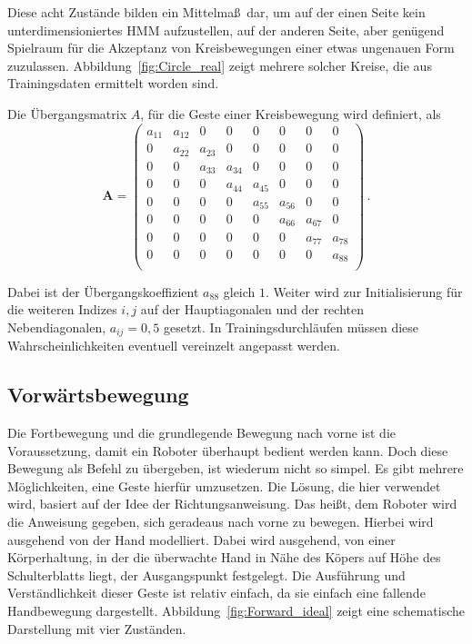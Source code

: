 Diese acht Zust\"ande bilden ein Mittelma\ss~dar, um auf der einen Seite kein unterdimensioniertes \gls{HMM} aufzustellen, auf der anderen Seite, aber gen\"ugend Spielraum f\"ur die Akzeptanz von Kreisbewegungen einer etwas ungenauen Form zuzulassen. Abbildung~\ref{fig:Circle_real} zeigt mehrere solcher Kreise, die aus Trainingsdaten ermittelt worden sind.


Die \"Ubergangsmatrix $A$, f\"ur die Geste einer Kreisbewegung wird definiert, als
\begin{equation}
\mathbf{A} = 
\begin{pmatrix}
a_{11} & a_{12} & 0 & 0 & 0 & 0 & 0 & 0 \\
0 & a_{22} & a_{23} & 0 & 0 & 0 & 0 & 0 \\
0 & 0 & a_{33} & a_{34} & 0 & 0 & 0 & 0 \\
0 & 0 & 0 & a_{44} & a_{45} & 0 & 0 & 0 \\
0 & 0 & 0 & 0 & a_{55} & a_{56} & 0 & 0 \\
0 & 0 & 0 & 0 & 0 & a_{66} & a_{67} & 0 \\
0 & 0 & 0 & 0 & 0 & 0 & a_{77} & a_{78} \\
0 & 0 & 0 & 0 & 0 & 0 & 0 & a_{88} \\
\end{pmatrix} \, .
\end{equation}

Dabei ist der \"Ubergangskoeffizient $a_{88}$ gleich $1$. Weiter wird zur Initialisierung f\"ur die weiteren Indizes $i, j$ auf der Hauptiagonalen und der rechten Nebendiagonalen, $a_{ij} = 0,5$ gesetzt. In Trainingsdurchl\"aufen m\"ussen diese Wahrscheinlichkeiten eventuell vereinzelt angepasst werden.

\subsection{Vorw\"artsbewegung}

Die Fortbewegung und die grundlegende Bewegung nach vorne ist die Voraussetzung, damit ein Roboter \"uberhaupt bedient werden kann. Doch diese Bewegung als Befehl zu \"ubergeben, ist wiederum nicht so simpel. Es gibt mehrere M\"oglichkeiten, eine Geste hierf\"ur umzusetzen. Die L\"osung, die hier verwendet wird, basiert auf der Idee der Richtungsanweisung. Das hei\ss t, dem Roboter wird die Anweisung gegeben, sich geradeaus nach vorne zu bewegen.
\newline
Hierbei wird ausgehend von der Hand modelliert. Dabei wird ausgehend, von einer K\"orperhaltung, in der die \"uberwachte Hand in N\"ahe des K\"opers auf H\"ohe des Schulterblatts liegt, der Ausgangspunkt festgelegt. Die Ausf\"uhrung und Verst\"andlichkeit dieser Geste ist relativ einfach, da sie einfach eine fallende Handbewegung dargestellt. Abbildung~\ref{fig:Forward_ideal} zeigt eine schematische Darstellung mit vier Zust\"anden.

